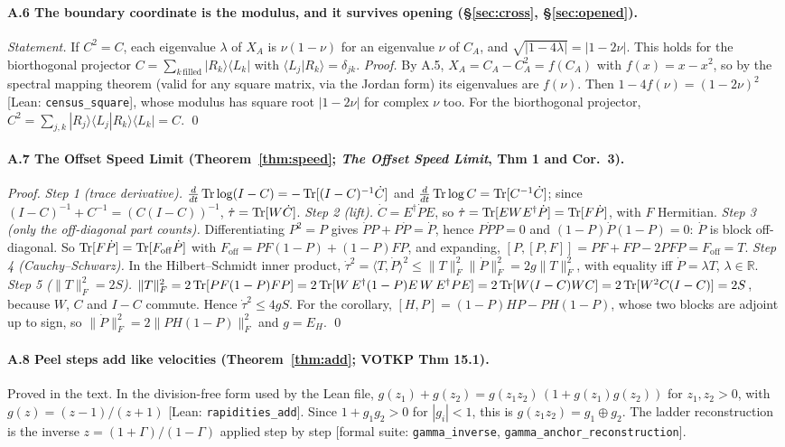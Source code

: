 \paragraph{A.6 The boundary coordinate is the modulus, and it survives opening (§\ref{sec:cross}, §\ref{sec:opened}).}
\emph{Statement.} If $C^2=C$, each eigenvalue $\lambda$ of $X_A$ is $\nu(1-\nu)$ for an eigenvalue $\nu$ of $C_A$, and $\sqrt{|1-4\lambda|}=|1-2\nu|$. This holds for the biorthogonal projector $C=\sum_{k\,\mathrm{filled}}|R_k\rangle\langle L_k|$ with $\langle L_j|R_k\rangle=\delta_{jk}$.
\emph{Proof.} By A.5, $X_A=C_A-C_A^2=f(C_A)$ with $f(x)=x-x^2$, so by the spectral mapping theorem (valid for any square matrix, via the Jordan form) its eigenvalues are $f(\nu)$. Then $1-4f(\nu)=(1-2\nu)^2$ \textsf{[Lean: \texttt{census\_square}]}, whose modulus has square root $|1-2\nu|$ for complex $\nu$ too. For the biorthogonal projector, $C^2=\sum_{j,k}|R_j\rangle\langle L_j|R_k\rangle\langle L_k|=C$. \qed

\paragraph{A.7 The Offset Speed Limit (Theorem~\ref{thm:speed}; \emph{The Offset Speed Limit}, Thm 1 and Cor.~3).}
\emph{Proof.} \emph{Step 1 (trace derivative).} $\frac{d}{dt}\operatorname{Tr}\log(I-C)=-\operatorname{Tr}[(I-C)^{-1}\dot C]$ and $\frac d{dt}\operatorname{Tr}\log C=\operatorname{Tr}[C^{-1}\dot C]$; since $(I-C)^{-1}+C^{-1}=(C(I-C))^{-1}$, $\dot\tau=\operatorname{Tr}[W\dot C]$. \emph{Step 2 (lift).} $\dot C=E^\dagger\dot PE$, so $\dot\tau=\operatorname{Tr}[EWE^\dagger\dot P]=\operatorname{Tr}[F\dot P]$, with $F$ Hermitian. \emph{Step 3 (only the off-diagonal part counts).} Differentiating $P^2=P$ gives $\dot PP+P\dot P=\dot P$, hence $P\dot PP=0$ and $(1-P)\dot P(1-P)=0$: $\dot P$ is block off-diagonal. So $\operatorname{Tr}[F\dot P]=\operatorname{Tr}[F_{\mathrm{off}}\dot P]$ with $F_{\mathrm{off}}=PF(1-P)+(1-P)FP$, and expanding, $[P,[P,F]]=PF+FP-2PFP=F_{\mathrm{off}}=T$. \emph{Step 4 (Cauchy–Schwarz).} In the Hilbert–Schmidt inner product, $\dot\tau^2=\langle T,\dot P\rangle^2\le\|T\|_F^2\|\dot P\|_F^2=2g\|T\|_F^2$, with equality iff $\dot P=\lambda T$, $\lambda\in\mathbb R$. \emph{Step 5 ($\|T\|_F^2=2S$).} $\|T\|_F^2=2\operatorname{Tr}[PF(1-P)FP]=2\operatorname{Tr}[W\,E^\dagger(1-P)E\,W\,E^\dagger PE]=2\operatorname{Tr}[W(I-C)WC]=2\operatorname{Tr}[W^2C(I-C)]=2S$, because $W$, $C$ and $I-C$ commute. Hence $\dot\tau^2\le4gS$. For the corollary, $[H,P]=(1-P)HP-PH(1-P)$, whose two blocks are adjoint up to sign, so $\|\dot P\|_F^2=2\|PH(1-P)\|_F^2$ and $g=E_H$. \qed

\paragraph{A.8 Peel steps add like velocities (Theorem~\ref{thm:add}; VOTKP Thm 15.1).}
Proved in the text. In the division-free form used by the Lean file, $g(z_1)+g(z_2)=g(z_1z_2)\,(1+g(z_1)g(z_2))$ for $z_1,z_2>0$, with $g(z)=(z-1)/(z+1)$ \textsf{[Lean: \texttt{rapidities\_add}]}. Since $1+g_1g_2>0$ for $|g_i|<1$, this is $g(z_1z_2)=g_1\oplus g_2$. The ladder reconstruction is the inverse $z=(1+\Gamma)/(1-\Gamma)$ applied step by step \textsf{[formal suite: \texttt{gamma\_inverse}, \texttt{gamma\_anchor\_reconstruction}]}.

